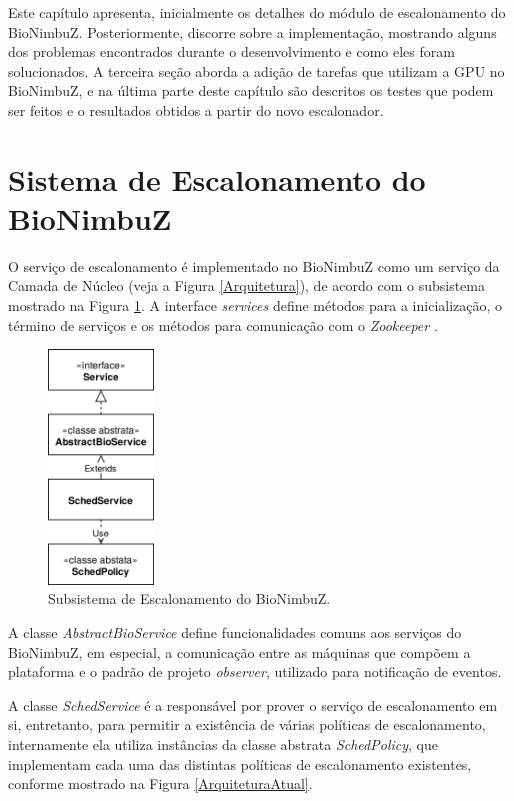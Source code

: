 
Este capítulo apresenta, inicialmente os detalhes do módulo de escalonamento do BioNimbuZ. Posteriormente, discorre sobre a implementação, mostrando alguns dos problemas encontrados durante o desenvolvimento e como eles foram solucionados. A terceira seção aborda a adição de tarefas que utilizam a \acrshort{GPU} no BioNimbuZ, e na última parte deste capítulo são descritos os testes que podem ser feitos e o resultados obtidos a partir do novo escalonador.

\section{Sistema de Escalonamento do BioNimbuZ}

O serviço de escalonamento é implementado no BioNimbuZ como um serviço da Camada de Núcleo (veja a Figura \ref{Arquitetura}), de acordo com o subsistema mostrado na Figura \ref{SubsistemaDeEscalonamento}. A interface \textit{services} define métodos para a inicialização, o término de serviços e os métodos para comunicação com o \textit{Zookeeper} \cite{Zookeeper}. 
\begin{figure}[htbp]
	\centerline{\includegraphics[width=2.8cm]{img/SubsistemaDeEscalonamento.png}}
	\caption{Subsistema de Escalonamento do BioNimbuZ.}
	\label{SubsistemaDeEscalonamento}
\end{figure}
A classe \textit{AbstractBioService} define funcionalidades comuns aos serviços do BioNimbuZ, em especial, a comunicação entre as máquinas que compõem a plataforma e o padrão de projeto \textit{observer}, utilizado para notificação de eventos.

A classe \textit{SchedService} é a responsável por prover o serviço de escalonamento em si, entretanto, para permitir a existência de várias políticas de escalonamento, internamente ela utiliza instâncias da classe abstrata \textit{SchedPolicy}, que implementam cada uma das distintas políticas de escalonamento existentes, conforme mostrado na Figura \ref{ArquiteturaAtual}.

